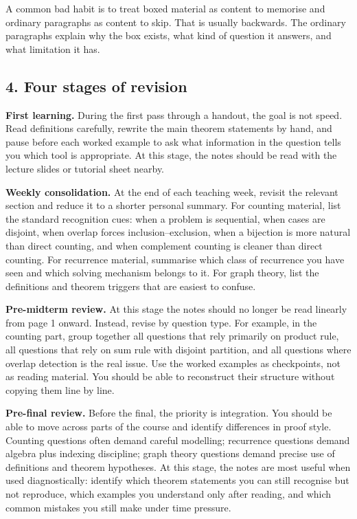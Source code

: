 \documentclass[12pt]{article}
\begin{document}
A common bad habit is to treat boxed material as content to memorise and ordinary paragraphs as content to skip. That is usually backwards. The ordinary paragraphs explain why the box exists, what kind of question it answers, and what limitation it has.

\subsection*{4. Four stages of revision}

\textbf{First learning.}
During the first pass through a handout, the goal is not speed. Read definitions carefully, rewrite the main theorem statements by hand, and pause before each worked example to ask what information in the question tells you which tool is appropriate. At this stage, the notes should be read with the lecture slides or tutorial sheet nearby.

\textbf{Weekly consolidation.}
At the end of each teaching week, revisit the relevant section and reduce it to a shorter personal summary. For counting material, list the standard recognition cues: when a problem is sequential, when cases are disjoint, when overlap forces inclusion--exclusion, when a bijection is more natural than direct counting, and when complement counting is cleaner than direct counting. For recurrence material, summarise which class of recurrence you have seen and which solving mechanism belongs to it. For graph theory, list the definitions and theorem triggers that are easiest to confuse.

\textbf{Pre-midterm review.}
At this stage the notes should no longer be read linearly from page 1 onward. Instead, revise by question type. For example, in the counting part, group together all questions that rely primarily on product rule, all questions that rely on sum rule with disjoint partition, and all questions where overlap detection is the real issue. Use the worked examples as checkpoints, not as reading material. You should be able to reconstruct their structure without copying them line by line.

\textbf{Pre-final review.}
Before the final, the priority is integration. You should be able to move across parts of the course and identify differences in proof style. Counting questions often demand careful modelling; recurrence questions demand algebra plus indexing discipline; graph theory questions demand precise use of definitions and theorem hypotheses. At this stage, the notes are most useful when used diagnostically: identify which theorem statements you can still recognise but not reproduce, which examples you understand only after reading, and which common mistakes you still make under time pressure.
\end{document}
